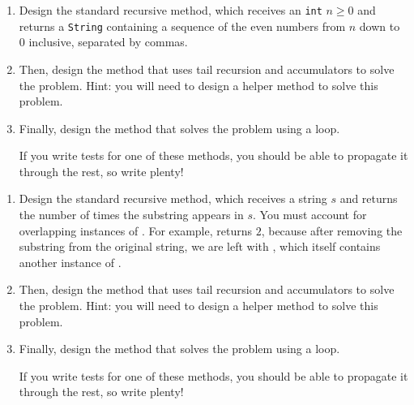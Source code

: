 \begin{enumerate}[label=(\alph*)]
\item Design the standard recursive  method, which receives an \texttt{int} $n \geq 0$ and returns a \texttt{String} containing a sequence of the even numbers from $n$ down to $0$ inclusive, separated by commas.

\item Then, design the  method that uses tail recursion and accumulators to solve the problem. Hint: you will need to design a  helper method to solve this problem.

\item Finally, design the  method that solves the problem using a loop.

If you write tests for one of these methods, you should be able to propagate it through the rest, so write plenty!
\end{enumerate}

\begin{enumerate}[label=(\alph*)]
    \item Design the standard recursive  method, which receives a string $s$ and returns the number of times the substring  appears in $s$. You must account for overlapping instances of . For example,  returns $2$, because after removing the substring  from the original string, we are left with , which itself contains another instance of .

    \item Then, design the  method that uses tail recursion and accumulators to solve the problem. Hint: you will need to design a  helper method to solve this problem.

    \item Finally, design the  method that solves the problem using a loop.

    If you write tests for one of these methods, you should be able to propagate it through the rest, so write plenty!
\end{enumerate}


